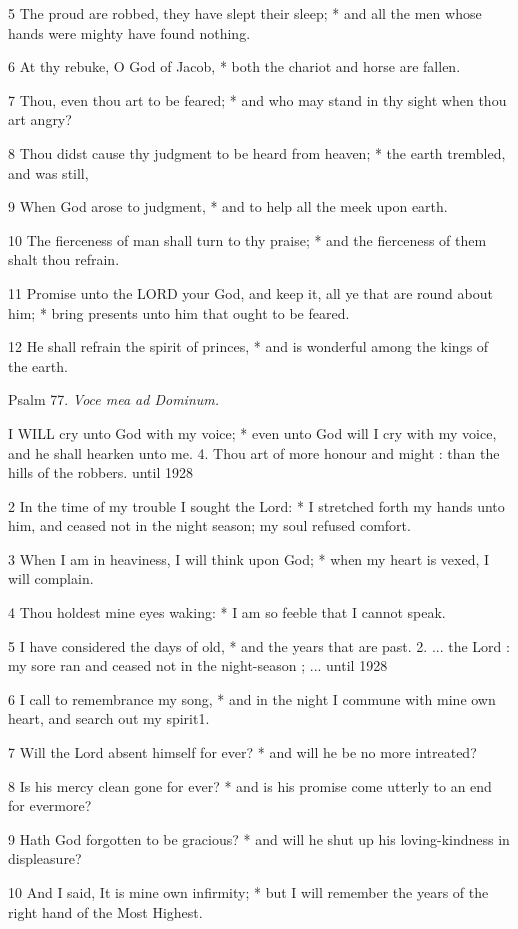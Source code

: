 5 The proud are robbed, they have slept their sleep;
* and all the men whose hands were mighty have found nothing.

6 At thy rebuke, O God of Jacob, * both the chariot
and horse are fallen.

7 Thou, even thou art to be feared; * and who may stand
in thy sight when thou art angry?

8 Thou didst cause thy judgment to be heard from heaven;
* the earth trembled, and was still,

9 When God arose to judgment, * and to help all the
meek upon earth.

10 The fierceness of man shall turn to thy praise;
* and the fierceness of them shalt thou refrain.

11 Promise unto the LORD your God, and keep it, all
ye that are round about him; * bring presents unto him that ought to be
feared.

12 He shall refrain the spirit of princes, * and is
wonderful among the kings of the earth.

Psalm
77. \emph{Voce mea ad Dominum.}

I
WILL cry unto God with my voice; * even unto God will I cry with my voice,
and he shall hearken unto me. 4. Thou art of more honour
and might : than the hills of the robbers.
until 1928

2 In the time of my trouble I sought the Lord: * I stretched forth my hands
unto him, and ceased not in the night season; my soul refused comfort.

3 When I am in heaviness, I will think upon God; * when
my heart is vexed, I will complain.

4 Thou holdest mine eyes waking: * I am so feeble that
I cannot speak.

5 I have considered the days of old, * and the years
that are past. 2. ... the Lord : my sore
ran and ceased not in the night-season ; ...
until 1928

6 I call to remembrance my song, * and in the night I commune with mine
own heart, and search out my spirit1.

7 Will the Lord absent himself for ever? * and will he
be no more intreated?

8 Is his mercy clean gone for ever? * and is his promise
come utterly to an end for evermore?

9 Hath God forgotten to be gracious? * and will he shut
up his loving-kindness in displeasure?

10 And I said, It is mine own infirmity; * but I will
remember the years of the right hand of the Most Highest.

